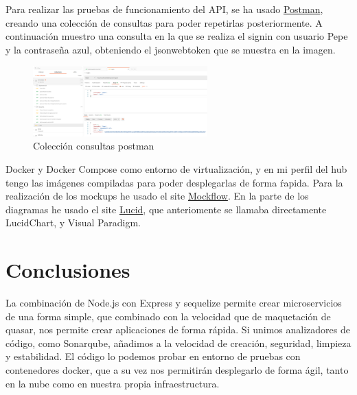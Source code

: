 \documentclass[11pt,spanish,listoffigures,listoftables]{tfgetsinf}
\begin{document}
Para realizar las pruebas de funcionamiento del API, se ha usado \href{https://www.postman.com/}{Postman}, creando una colección de consultas para poder repetirlas posteriormente.
A continuación muestro una consulta en la que se realiza el signin con usuario Pepe y la contraseña azul, obteniendo el jsonwebtoken que se muestra en la imagen.
\begin{figure}[h!] %
  \centering
   \includegraphics[width=0.60\textwidth]{img/postman.png}
   \caption{Colección consultas postman}
   \label{fig:postman}
 \end{figure}
Docker y Docker Compose como entorno de virtualización, y en mi perfil del hub tengo las imágenes compiladas para poder desplegarlas de forma ŕapida. 
Para la realización de los mockups he usado el site \href{https://mockflow.com/app/#Wireframe}{Mockflow}.
En la parte de los diagramas he usado el site \href{https://lucid.app/}{Lucid}, que anteriomente se llamaba directamente LucidChart, y Visual Paradigm.


\chapter{Conclusiones}

La combinación de Node.js con Express y sequelize permite crear microservicios de una forma simple, que combinado con la velocidad que de maquetación de quasar, nos permite crear aplicaciones de forma rápida.
Si unimos analizadores de código, como Sonarqube, añadimos a la velocidad de creación, seguridad, limpieza y estabilidad. 
El código lo podemos probar en entorno de pruebas con contenedores docker, que a su vez nos permitirán desplegarlo de forma ágil, tanto en la nube como en nuestra propia infraestructura.

\end{document}
